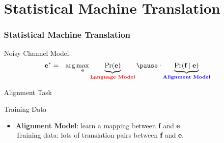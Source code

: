 





\section{Statistical Machine Translation}
\frame{\tableofcontents[currentsection]}

\begin{frame}
\frametitle{Statistical Machine Translation}
\begin{block}{Noisy Channel Model}
\begin{eqnarray*}
\textbf{e}^\ast & = & \arg\max_{\textbf{e}} \underbrace{\Pr(\textbf{e})}_{\color{red}\textbf{Language Model}} \pause \cdot \underbrace{\Pr(\textbf{f} \mid \textbf{e})}_{\color{blue}\textbf{Alignment Model}}
\end{eqnarray*}
\end{block}
\end{frame}

\begin{frame}
\def\blockdist{2.0}
\begin{alertblock}{Alignment Task}
\end{alertblock}\pause
\begin{alertblock}{Training Data}
\begin{itemize}[<+->]
\item \color{blue}\textbf{Alignment Model}: learn a mapping between \textbf{f} and \textbf{e}. \\
Training data: lots of translation pairs between \textbf{f} and \textbf{e}.
\end{itemize}
\end{alertblock}
\end{frame}

